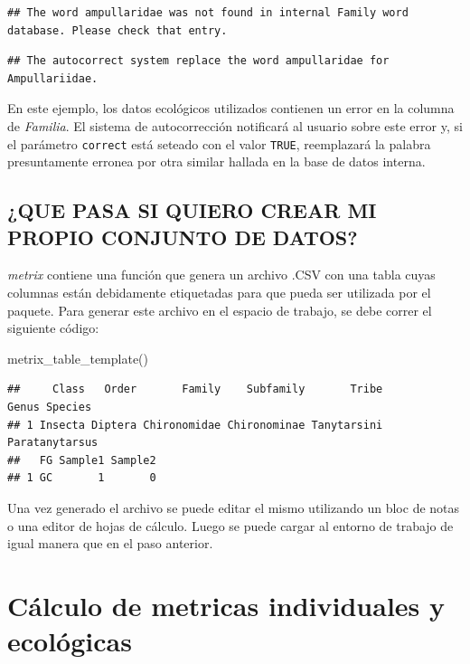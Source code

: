 \documentclass[
]{book}
\newenvironment{Shaded}{\begin{snugshade}}{\end{snugshade}}
\newcommand{\FunctionTok}[1]{\textcolor[rgb]{0.00,0.00,0.00}{#1}}
\newcommand{\NormalTok}[1]{#1}
\begin{document}
\begin{verbatim}
## The word ampullaridae was not found in internal Family word database. Please check that entry.
\end{verbatim}

\begin{verbatim}
## The autocorrect system replace the word ampullaridae for Ampullariidae.
\end{verbatim}

En este ejemplo, los datos ecológicos utilizados contienen un error en la columna de \emph{Familia}.
El sistema de autocorrección notificará al usuario sobre este error y, si el parámetro \texttt{correct} está seteado con el valor \texttt{TRUE}, reemplazará la palabra presuntamente erronea por otra similar hallada en la base de datos interna.

\hypertarget{que-pasa-si-quiero-crear-mi-propio-conjunto-de-datos}{%
\subsection{¿QUE PASA SI QUIERO CREAR MI PROPIO CONJUNTO DE DATOS?}\label{que-pasa-si-quiero-crear-mi-propio-conjunto-de-datos}}

\emph{metrix} contiene una función que genera un archivo .CSV con una tabla cuyas columnas están debidamente etiquetadas para que pueda ser utilizada por el paquete.
Para generar este archivo en el espacio de trabajo, se debe correr el siguiente código:

\begin{Shaded}
\begin{Highlighting}[]
\FunctionTok{metrix\_table\_template}\NormalTok{()}
\end{Highlighting}
\end{Shaded}

\begin{verbatim}
##     Class   Order       Family    Subfamily       Tribe          Genus Species
## 1 Insecta Diptera Chironomidae Chironominae Tanytarsini Paratanytarsus        
##   FG Sample1 Sample2
## 1 GC       1       0
\end{verbatim}

Una vez generado el archivo se puede editar el mismo utilizando un bloc de notas o una editor de hojas de cálculo.
Luego se puede cargar al entorno de trabajo de igual manera que en el paso anterior.

\hypertarget{cuxe1lculo-de-metricas-individuales-y-ecoluxf3gicas}{%
\section{Cálculo de metricas individuales y ecológicas}\label{cuxe1lculo-de-metricas-individuales-y-ecoluxf3gicas}}
\end{document}
